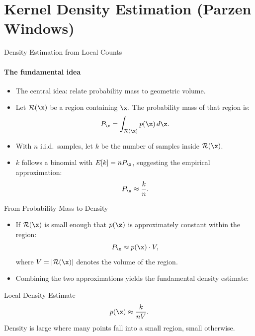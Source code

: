 \section{Kernel Density Estimation (Parzen Windows)}

\begin{frame}{Density Estimation from Local Counts}
  \framesubtitle{The fundamental idea}
  \begin{itemize}
    \item The central idea: relate probability mass to \alert{geometric volume}.
    \item Let $\mathcal{R}(\x)$ be a region containing $\x$. The probability mass of that region is:
    \[
      P_\x = \int_{\mathcal{R}(\x)} p(\z)\,d\z.
    \]
    \item With $n$ i.i.d.\ samples, let $k$ be the number of samples inside $\mathcal{R}(\x)$.
    \item $k$ follows a binomial with $E[k] = nP_\x$, suggesting the empirical approximation:
    \[
      P_\x \approx \frac{k}{n}.
    \]
  \end{itemize}
\end{frame}

\begin{frame}{From Probability Mass to Density}
  \begin{itemize}
    \item If $\mathcal{R}(\x)$ is small enough that $p(\z)$ is approximately constant within the region:
    \[
      P_\x \approx p(\x) \cdot V,
    \]
    where $V = |\mathcal{R}(\x)|$ denotes the volume of the region.
    \item Combining the two approximations yields the \alert{fundamental density estimate}:
  \end{itemize}
  \begin{block}{Local Density Estimate}
    \[
      p(\x) \approx \frac{k}{nV}.
    \]
    Density is large where many points fall into a small region, small otherwise.
  \end{block}
\end{frame}

